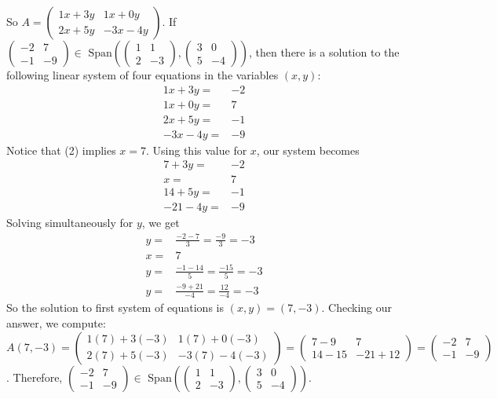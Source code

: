 \documentclass[12pt]{article}
\newenvironment{problem}[2][Problem]
{
	\begin{trivlist} 
		\item[\hskip \labelsep {\bfseries #1 #2:}]
	}
{
	\end{trivlist}
	}
\newenvironment{solution}[1][Solution]
{
	\begin{trivlist} 
		\item[\hskip \labelsep {\itshape #1:}]
	}
	{
	\end{trivlist}
}
\begin{document}
\begin{problem}{3}
\begin{solution}
So $A=\begin{pmatrix} 1x+3y&1x+0y\\2x+5y&-3x-4y \end{pmatrix}$. If $\begin{pmatrix} -2&7\\-1&-9 \end{pmatrix} \in \text{ Span} \left( \begin{pmatrix} 1&1\\2&-3 \end{pmatrix}, \begin{pmatrix} 3&0\\5&-4 \end{pmatrix} \right)$, then there is a solution to the following linear system of four equations in the variables $(x,y)$:
\begin{align}
1x+3y=&-2\\
1x+0y=&7\\
2x+5y=&-1\\
-3x-4y=&-9
\end{align}
Notice that (2) implies $x=7$. Using this value for $x$, our system becomes
\begin{align}
7+3y=&-2\\
x=&7\\
14+5y=&-1\\
-21-4y=&-9
\end{align}
Solving simultaneously for $y$, we get
\begin{align}
y=&\frac{-2-7}{3} =\frac{-9}{3} = -3 \\
x=&7\\
y=&\frac{-1-14}{5} = \frac{-15}{5} = -3\\
y=&\frac{-9+21}{-4} =\frac{12}{-4} = -3
\end{align}
So the solution to first system of equations is $(x,y)=(7,-3)$. Checking our answer, we compute: $A(7,-3) =\begin{pmatrix} 1(7)+3(-3)&1(7)+0(-3)\\2(7)+5(-3)&-3(7)-4(-3) \end{pmatrix} =\begin{pmatrix} 7-9&7\\14-15&-21+12 \end{pmatrix} = \begin{pmatrix} -2&7\\-1&-9 \end{pmatrix}$. Therefore, $\begin{pmatrix} -2&7\\-1&-9 \end{pmatrix} \in \text{ Span} \left( \begin{pmatrix} 1&1\\2&-3 \end{pmatrix}, \begin{pmatrix} 3&0\\5&-4 \end{pmatrix} \right)$.
\end{solution}
\end{problem}
\end{document}
